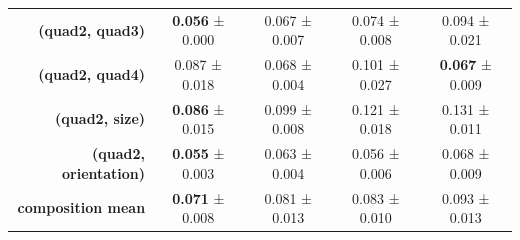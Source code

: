 \begin{tabular}{rcccc}
\textbf{(quad2, quad3)} & \textbf{0.056} ± 0.000 & 0.067 ± 0.007 & 0.074 ± 0.008 & 0.094 ± 0.021 \\
\textbf{(quad2, quad4)} & 0.087 ± 0.018 & 0.068 ± 0.004 & 0.101 ± 0.027 & \textbf{0.067} ± 0.009 \\
\textbf{(quad2, size)} & \textbf{0.086} ± 0.015 & 0.099 ± 0.008 & 0.121 ± 0.018 & 0.131 ± 0.011 \\
\textbf{(quad2, orientation)} & \textbf{0.055} ± 0.003 & 0.063 ± 0.004 & 0.056 ± 0.006 & 0.068 ± 0.009 \\
\addlinespace
\textbf{composition mean} & \textbf{0.071} ± 0.008 & 0.081 ± 0.013 & 0.083 ± 0.010 & 0.093 ± 0.013 \\
\midrule
\bottomrule
\end{tabular}